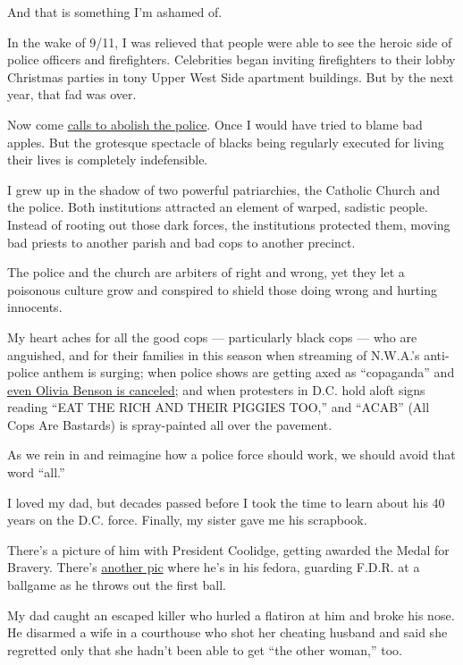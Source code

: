 And that is something I'm ashamed of.

In the wake of 9/11, I was relieved that people were able to see the
heroic side of police officers and firefighters. Celebrities began
inviting firefighters to their lobby Christmas parties in tony Upper
West Side apartment buildings. But by the next year, that fad was over.

Now come
\href{https://www.nytimes3xbfgragh.onion/2020/06/12/opinion/sunday/floyd-abolish-defund-police.html}{calls
to abolish the police}. Once I would have tried to blame bad apples. But
the grotesque spectacle of blacks being regularly executed for living
their lives is completely indefensible.

I grew up in the shadow of two powerful patriarchies, the Catholic
Church and the police. Both institutions attracted an element of warped,
sadistic people. Instead of rooting out those dark forces, the
institutions protected them, moving bad priests to another parish and
bad cops to another precinct.

The police and the church are arbiters of right and wrong, yet they let
a poisonous culture grow and conspired to shield those doing wrong and
hurting innocents.

My heart aches for all the good cops --- particularly black cops --- who
are anguished, and for their families in this season when streaming of
N.W.A.'s anti-police anthem is surging; when police shows are getting
axed as ``copaganda'' and
\href{https://www.rollingstone.com/culture/culture-features/olivia-benson-svu-mariska-hargitay-canceled-cops-1014181/}{even
Olivia Benson is canceled}; and when protesters in D.C. hold aloft signs
reading ``EAT THE RICH AND THEIR PIGGIES TOO,'' and ``ACAB'' (All Cops
Are Bastards) is spray-painted all over the pavement.

As we rein in and reimagine how a police force should work, we should
avoid that word ``all.''

I loved my dad, but decades passed before I took the time to learn about
his 40 years on the D.C. force. Finally, my sister gave me his
scrapbook.

There's a picture of him with President Coolidge, getting awarded the
Medal for Bravery. There's
\href{https://www.instagram.com/p/B4DnolcA85U/}{another pic} where he's
in his fedora, guarding F.D.R. at a ballgame as he throws out the first
ball.

My dad caught an escaped killer who hurled a flatiron at him and broke
his nose. He disarmed a wife in a courthouse who shot her cheating
husband and said she regretted only that she hadn't been able to get
``the other woman,'' too.

